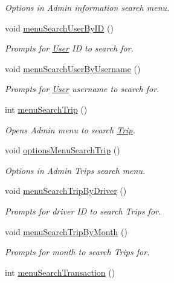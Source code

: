 \begin{Indent}
\begin{DoxyCompactItemize}
\begin{DoxyCompactList}\small\item\em Options in Admin information search menu. \end{DoxyCompactList}\item 
void \hyperlink{group___agency_gaf2c7b19ae6f03a1454b5a36c2343119a}{menu\+Search\+User\+By\+ID} ()
\begin{DoxyCompactList}\small\item\em Prompts for \hyperlink{class_user}{User} ID to search for. \end{DoxyCompactList}\item 
void \hyperlink{group___agency_ga4fae1609fafeba4ba99e64a46ffa497b}{menu\+Search\+User\+By\+Username} ()
\begin{DoxyCompactList}\small\item\em Prompts for \hyperlink{class_user}{User} username to search for. \end{DoxyCompactList}\item 
int \hyperlink{group___agency_ga486a2028ecfb5d9e07cb2c2082c8f4d1}{menu\+Search\+Trip} ()
\begin{DoxyCompactList}\small\item\em Opens Admin menu to search \hyperlink{class_trip}{Trip}. \end{DoxyCompactList}\item 
void \hyperlink{group___agency_ga6ef362edc162c9e2d6d659d2ef6ace96}{options\+Menu\+Search\+Trip} ()
\begin{DoxyCompactList}\small\item\em Options in Admin Trips search menu. \end{DoxyCompactList}\item 
void \hyperlink{group___agency_ga67eab1c222c93d13d3db69a3a3d1ea2f}{menu\+Search\+Trip\+By\+Driver} ()
\begin{DoxyCompactList}\small\item\em Prompts for driver ID to search Trips for. \end{DoxyCompactList}\item 
void \hyperlink{group___agency_ga2bd31a81607ba5d8f0c6deebf9c05681}{menu\+Search\+Trip\+By\+Month} ()
\begin{DoxyCompactList}\small\item\em Prompts for month to search Trips for. \end{DoxyCompactList}\item 
int \hyperlink{group___agency_ga8190f01535be829647cdb79e65bd6dbc}{menu\+Search\+Transaction} ()

\end{DoxyCompactItemize}
\end{Indent}
